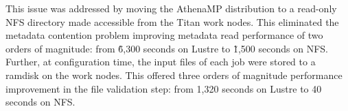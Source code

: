 %
%


This issue was addressed by moving the AthenaMP distribution to a read-only NFS
directory made accessible from the Titan work nodes. This eliminated the
metadata contention problem improving metadata read performance of two orders of
magnitude: from \~6,300 seconds on Lustre to \~1,500 seconds on NFS. Further, at
configuration time, the input files of each job were stored to a ramdisk on the
work nodes. This offered three orders of magnitude performance improvement in
the file validation step: from 1,320 seconds on Lustre to 40 seconds on NFS.

